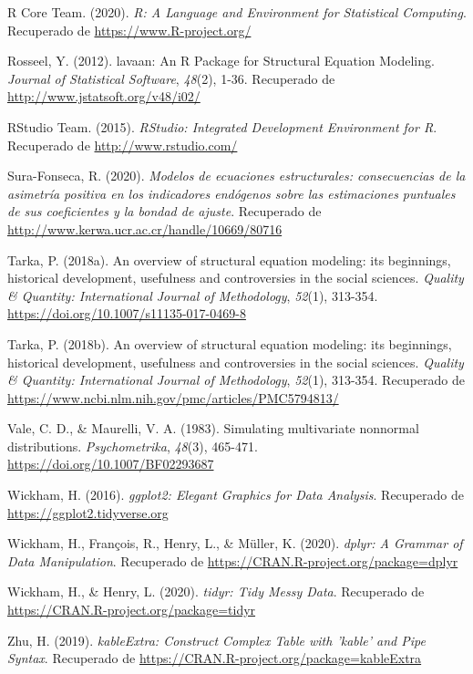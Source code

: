 \documentclass[
]{article}
\begin{document}
\leavevmode\hypertarget{ref-R}{}%
R Core Team. (2020). \emph{R: A Language and Environment for Statistical
Computing}. Recuperado de \url{https://www.R-project.org/}

\leavevmode\hypertarget{ref-lavaan}{}%
Rosseel, Y. (2012). lavaan: An R Package for Structural Equation
Modeling. \emph{Journal of Statistical Software}, \emph{48}(2), 1-36.
Recuperado de \url{http://www.jstatsoft.org/v48/i02/}

\leavevmode\hypertarget{ref-RStudio}{}%
RStudio Team. (2015). \emph{RStudio: Integrated Development Environment
for R}. Recuperado de \url{http://www.rstudio.com/}

\leavevmode\hypertarget{ref-sura}{}%
Sura-Fonseca, R. (2020). \emph{Modelos de ecuaciones estructurales:
consecuencias de la asimetría positiva en los indicadores endógenos
sobre las estimaciones puntuales de sus coeficientes y la bondad de
ajuste}. Recuperado de
\url{http://www.kerwa.ucr.ac.cr/handle/10669/80716}

\leavevmode\hypertarget{ref-tarka}{}%
Tarka, P. (2018a). An overview of structural equation modeling: its
beginnings, historical development, usefulness and controversies in the
social sciences. \emph{Quality \& Quantity: International Journal of
Methodology}, \emph{52}(1), 313-354.
\url{https://doi.org/10.1007/s11135-017-0469-8}

\leavevmode\hypertarget{ref-Tarka}{}%
Tarka, P. (2018b). An overview of structural equation modeling: its
beginnings, historical development, usefulness and controversies in the
social sciences. \emph{Quality \& Quantity: International Journal of
Methodology}, \emph{52}(1), 313-354. Recuperado de
\url{https://www.ncbi.nlm.nih.gov/pmc/articles/PMC5794813/}

\leavevmode\hypertarget{ref-Vale1983}{}%
Vale, C. D., \& Maurelli, V. A. (1983). Simulating multivariate
nonnormal distributions. \emph{Psychometrika}, \emph{48}(3), 465-471.
\url{https://doi.org/10.1007/BF02293687}

\leavevmode\hypertarget{ref-ggplot2}{}%
Wickham, H. (2016). \emph{ggplot2: Elegant Graphics for Data Analysis}.
Recuperado de \url{https://ggplot2.tidyverse.org}

\leavevmode\hypertarget{ref-dplyr}{}%
Wickham, H., François, R., Henry, L., \& Müller, K. (2020). \emph{dplyr:
A Grammar of Data Manipulation}. Recuperado de
\url{https://CRAN.R-project.org/package=dplyr}

\leavevmode\hypertarget{ref-tidyr}{}%
Wickham, H., \& Henry, L. (2020). \emph{tidyr: Tidy Messy Data}.
Recuperado de \url{https://CRAN.R-project.org/package=tidyr}

\leavevmode\hypertarget{ref-kableExtra}{}%
Zhu, H. (2019). \emph{kableExtra: Construct Complex Table with 'kable'
and Pipe Syntax}. Recuperado de
\url{https://CRAN.R-project.org/package=kableExtra}
\end{document}
